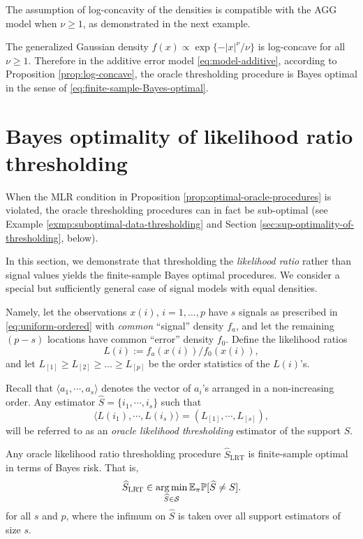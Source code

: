 The assumption of log-concavity of the densities is compatible with the AGG model when $\nu\ge1$, as 
demonstrated in the next example.

\begin{example} \label{exmp:AGG-logconcave}
The generalized Gaussian density $f(x)\propto \exp\{-|x|^\nu/\nu\}$ is log-concave for all $\nu\ge1$.
Therefore in the additive error model \eqref{eq:model-additive}, according to Proposition \ref{prop:log-concave}, the oracle thresholding procedure is Bayes optimal in the sense of \eqref{eq:finite-sample-Bayes-optimal}.
\end{example}



\section{Bayes optimality of likelihood ratio thresholding}
\label{subsec:optimal-procedure-super-exponential}

When the MLR condition in Proposition \ref{prop:optimal-oracle-procedures} is violated, the oracle thresholding 
procedures can in fact be sub-optimal (see Example \ref{exmp:suboptimal-data-thresholding} and 
Section \ref{sec:sup-optimality-of-thresholding}, below).  
%

In this section, we demonstrate that thresholding the \emph{likelihood ratio} rather than signal values
yields the finite-sample Bayes optimal procedures.  We consider a special but sufficiently general case of signal 
models with equal densities.

Namely, let the observations $x(i)$, $i=1,\ldots,p$ have $s$ signals as prescribed in \eqref{eq:uniform-ordered} with {\em common} ``signal'' density $f_a$, and let the remaining $(p-s)$ locations have common ``error'' density $f_0$.
Define the likelihood ratios 
$$
L(i) := {f_a(x(i))}\big/{f_0(x(i))},
$$
and let $L_{[1]} \ge L_{[2]} \ge \ldots \ge L_{[p]}$ be the order statistics of the $L(i)$'s.

\begin{definition} Recall that $\langle a_1,\cdots,a_s\rangle$ denotes
the vector of $a_i$'s arranged in a non-increasing order.  Any estimator $\hat S = \{i_1,\cdots,i_s\}$ such that
$$
\langle L(i_1),\cdots,L(i_s) \rangle = (L_{[1]},\cdots,L_{[s]}),
$$
will be referred to as an {\em oracle likelihood thresholding} estimator of the support $S$.
\end{definition}
\begin{proposition} \label{prop:likelihood-ratio-thresholding} Any oracle likelihood ratio thresholding 
procedure $\widehat{S}_{\text{LRT}}$ is finite-sample optimal in terms of Bayes risk. That is,
\begin{equation}
    \widehat{S}_{\text{LRT}} \in \operatorname*{arg\,min}_{\widehat{S} \in {\mathcal S}} {\mathbb E}_\pi {\mathbb P}[\widehat{S} \neq S].
\end{equation}
for all $s$ and $p$, where the infimum on $\widehat{S}$ is taken over all support estimators of size $s$.
\end{proposition} 

